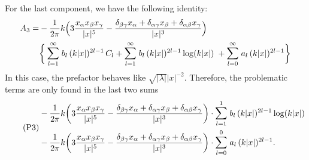 For the last component, we have the following identity:
\begin{align*}
  A_3 = 
  & - \frac{1}{2\pi} k \Big( 3 \frac{x_\alpha x_\beta x_\gamma}{|x|^5} - \frac{\delta_{\beta\gamma} x_\alpha + \delta_{\alpha\gamma} x_\beta + \delta_{\alpha\beta} x_\gamma}{|x|^3} \Big)  \\
  & \bigg\{ 
  \: \mathlarger{\sum}_{l = 1}^\infty \; b_l \, (k|x|)^{2l - 1} \, C_l 
  + \mathlarger{\sum}_{l = 1}^\infty \; b_l \, (k|x|)^{2l - 1} \log(k|x|) \; 
  + \mathlarger{\sum}_{l = 0}^\infty \; a_l \, (k|x|)^{2l - 1} \bigg\}
\end{align*}
In this case, the prefactor behaves like $\sqrt{|\lambda|} |x|^{-2}$.
Therefore, the problematic terms are only found in the last two sums
\begin{align}
  \label{eq:P3}
  \tag{P3}
  \begin{alignedat}{1}
    &- \frac{1}{2\pi} k \bigg( 3 \frac{x_\alpha x_\beta x_\gamma}{|x|^5} - \frac{\delta_{\beta\gamma} x_\alpha + \delta_{\alpha\gamma} x_\beta + \delta_{\alpha\beta} x_\gamma}{|x|^3} \bigg)
  \cdot \mathlarger{\sum}_{l = 1}^1 \; b_l \, (k|x|)^{2l - 1} \log(k|x|)  \\
    &- \frac{1}{2\pi} k \bigg( 3 \frac{x_\alpha x_\beta x_\gamma}{|x|^5} - \frac{\delta_{\beta\gamma} x_\alpha + \delta_{\alpha\gamma} x_\beta + \delta_{\alpha\beta} x_\gamma}{|x|^3} \bigg)
  \cdot \mathlarger{\sum}_{l = 0}^0 \; a_l \, (k|x|)^{2l - 1} .
  \end{alignedat}
\end{align}


